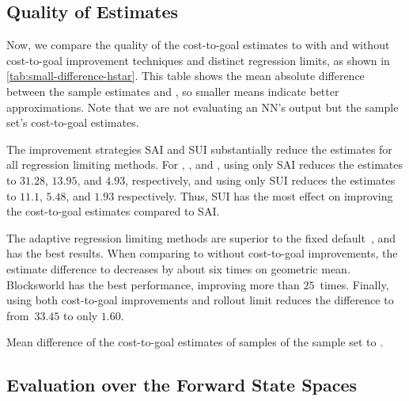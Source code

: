 \subsection{Quality of Estimates}
\label{sec:small-exps-hvalue-quality}

Now, we compare the quality of the cost-to-goal estimates to \hstar with and without cost-to-goal improvement techniques and distinct regression limits, as shown in \cref{tab:small-difference-hstar}. This table shows the mean absolute difference between the sample estimates and \hstar, so smaller means indicate better approximations. Note that we are not evaluating an NN's output but the sample set's cost-to-goal estimates.

The improvement strategies SAI and SUI substantially reduce the estimates for all regression limiting methods. For \rldefault, \rlfacts, and \rlmeanfx, using only SAI reduces the estimates to $31.28$, $13.95$, and $4.93$, respectively, and using only SUI reduces the estimates to $11.1$, $5.48$, and $1.93$ respectively. Thus, SUI has the most effect on improving the cost-to-goal estimates compared to SAI.

The adaptive regression limiting methods are superior to the fixed default~\rldefault, and \rlmeanfx has the best results. When comparing \rldefault to \rlmeanfx without cost-to-goal improvements, the estimate difference to \hstar decreases by about six times on geometric mean. Blocksworld has the best performance, improving more than $25$~times. Finally, using both cost-to-goal improvements and rollout limit \rlmeanfx reduces the difference to \hstar from~$33.45$ to only $1.60$.

\begin{table}[tb]
    \caption[Mean difference of the cost-to-goal estimates to \hstar.]{Mean difference of the cost-to-goal estimates of samples of the sample set to \hstar.}
    \label{tab:small-difference-hstar}
    \addmargin
    \centering
    
\end{table}

\subsection{Evaluation over the Forward State Spaces}
\label{sec:small-exps-hvalue-fss}

